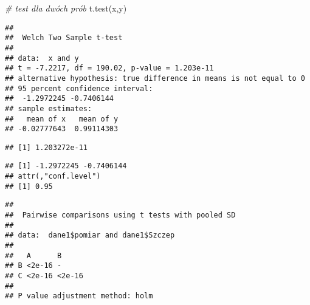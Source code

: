 \documentclass[
]{book}
\newenvironment{Shaded}{\begin{snugshade}}{\end{snugshade}}
\newcommand{\CommentTok}[1]{\textcolor[rgb]{0.56,0.35,0.01}{\textit{#1}}}
\newcommand{\FunctionTok}[1]{\textcolor[rgb]{0.00,0.00,0.00}{#1}}
\newcommand{\NormalTok}[1]{#1}
\newcommand{\OtherTok}[1]{\textcolor[rgb]{0.56,0.35,0.01}{#1}}
\newcommand{\SpecialCharTok}[1]{\textcolor[rgb]{0.00,0.00,0.00}{#1}}
\begin{document}
\begin{Shaded}
\begin{Highlighting}[]
\CommentTok{\# test dla dwóch prób}
\FunctionTok{t.test}\NormalTok{(x,y)}
\end{Highlighting}
\end{Shaded}

\begin{verbatim}
## 
##  Welch Two Sample t-test
## 
## data:  x and y
## t = -7.2217, df = 190.02, p-value = 1.203e-11
## alternative hypothesis: true difference in means is not equal to 0
## 95 percent confidence interval:
##  -1.2972245 -0.7406144
## sample estimates:
##   mean of x   mean of y 
## -0.02777643  0.99114303
\end{verbatim}

\begin{Shaded}
\end{Shaded}

\begin{verbatim}
## [1] 1.203272e-11
\end{verbatim}

\begin{Shaded}
\end{Shaded}

\begin{verbatim}
## [1] -1.2972245 -0.7406144
## attr(,"conf.level")
## [1] 0.95
\end{verbatim}

\begin{Shaded}
\end{Shaded}

\begin{verbatim}
## 
##  Pairwise comparisons using t tests with pooled SD 
## 
## data:  dane1$pomiar and dane1$Szczep 
## 
##   A      B     
## B <2e-16 -     
## C <2e-16 <2e-16
## 
## P value adjustment method: holm
\end{verbatim}
\end{document}
